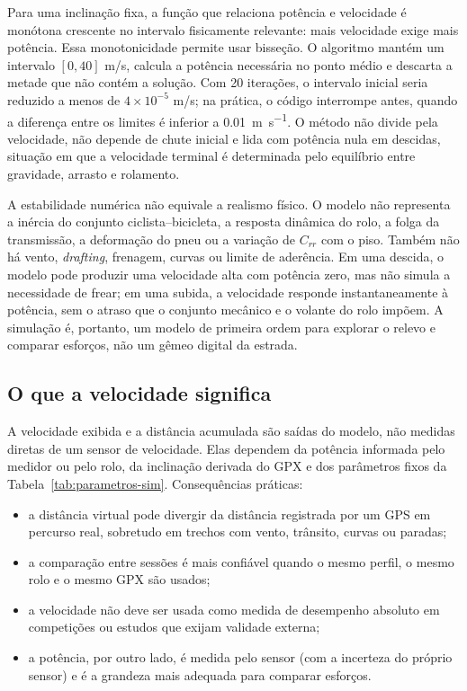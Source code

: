 Para uma inclinação fixa, a função que relaciona potência e velocidade é
monótona crescente no intervalo fisicamente relevante: mais velocidade exige
mais potência. Essa monotonicidade permite usar bisseção. O algoritmo mantém um
intervalo $[0, 40]$ m/s, calcula a potência necessária no ponto médio e descarta
a metade que não contém a solução. Com 20 iterações, o intervalo inicial seria
reduzido a menos de $4 \times 10^{-5}$ m/s; na prática, o código interrompe
antes, quando a diferença entre os limites é inferior a \SI{0.01}{\meter\per\second}.
O método não divide pela velocidade, não depende de chute inicial e lida com
potência nula em descidas, situação em que a velocidade terminal é determinada
pelo equilíbrio entre gravidade, arrasto e rolamento.

A estabilidade numérica não equivale a realismo físico. O modelo não representa
a inércia do conjunto ciclista--bicicleta, a resposta dinâmica do rolo, a
folga da transmissão, a deformação do pneu ou a variação de $C_{rr}$ com o piso.
Também não há vento, \textit{drafting}, frenagem, curvas ou limite de aderência.
Em uma descida, o modelo pode produzir uma velocidade alta com potência zero,
mas não simula a necessidade de frear; em uma subida, a velocidade responde
instantaneamente à potência, sem o atraso que o conjunto mecânico e o volante do
rolo impõem. A simulação é, portanto, um modelo de primeira ordem para
explorar o relevo e comparar esforços, não um gêmeo digital da estrada.

\subsection{O que a velocidade significa}
\label{sec:velocidade-significado}

A velocidade exibida e a distância acumulada são saídas do modelo, não medidas
diretas de um sensor de velocidade. Elas dependem da potência informada pelo
medidor ou pelo rolo, da inclinação derivada do GPX e dos parâmetros fixos
da Tabela~\ref{tab:parametros-sim}. Consequências práticas:

\begin{itemize}
    \item a distância virtual pode divergir da distância registrada por um
        GPS em percurso real, sobretudo em trechos com vento, trânsito, curvas
        ou paradas;
    \item a comparação entre sessões é mais confiável quando o mesmo perfil,
        o mesmo rolo e o mesmo GPX são usados;
    \item a velocidade não deve ser usada como medida de desempenho absoluto
        em competições ou estudos que exijam validade externa;
    \item a potência, por outro lado, é medida pelo sensor (com a incerteza do
        próprio sensor) e é a grandeza mais adequada para comparar esforços.
\end{itemize}

